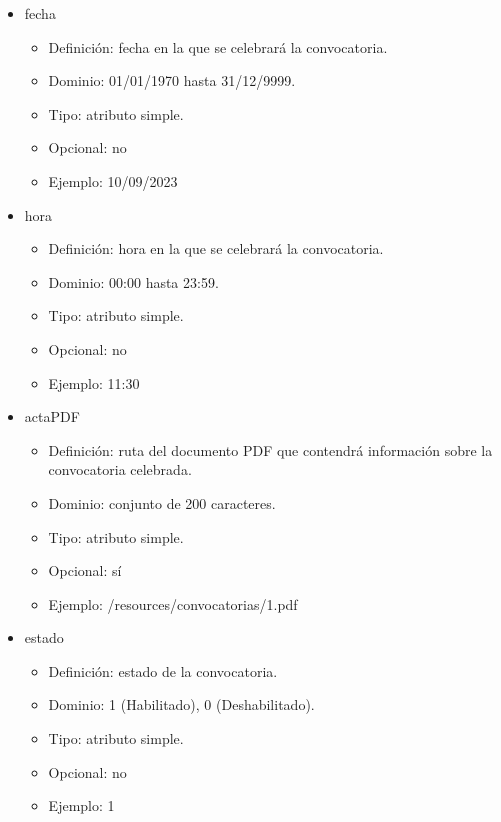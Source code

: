 \begin{itemize}
\begin{itemize}
        \item fecha
        \begin{itemize}
            \item Definición: fecha en la que se celebrará la convocatoria.
            \item Dominio: 01/01/1970 hasta 31/12/9999.
            \item Tipo: atributo simple.
            \item Opcional: no
            \item Ejemplo: 10/09/2023
        \end{itemize}

         \item hora
        \begin{itemize}
            \item Definición: hora en la que se celebrará la convocatoria.
            \item Dominio: 00:00 hasta 23:59.
            \item Tipo: atributo simple.
            \item Opcional: no
            \item Ejemplo: 11:30
        \end{itemize}

        \item actaPDF
        \begin{itemize}
            \item Definición: ruta del documento PDF que contendrá información sobre la convocatoria celebrada.
            \item Dominio: conjunto de 200 caracteres.
            \item Tipo: atributo simple.
            \item Opcional: sí
            \item Ejemplo: /resources/convocatorias/1.pdf
        \end{itemize}

        \item estado
        \begin{itemize}
            \item Definición: estado de la convocatoria.
            \item Dominio: 1 (Habilitado), 0 (Deshabilitado).
            \item Tipo: atributo simple.
            \item Opcional: no
            \item Ejemplo: 1
        \end{itemize}
    \end{itemize}


\end{itemize}
